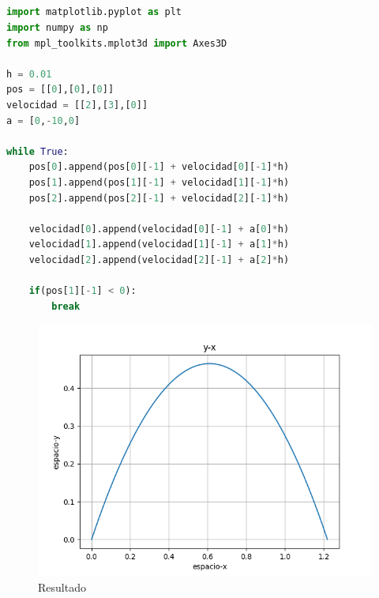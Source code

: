\documentclass{article}
\begin{document}
\subsection{}
\begin{lstlisting}[language=Python,caption=Desafío 1.1]
import matplotlib.pyplot as plt
import numpy as np
from mpl_toolkits.mplot3d import Axes3D

h = 0.01
pos = [[0],[0],[0]]
velocidad = [[2],[3],[0]]
a = [0,-10,0]

while True:
    pos[0].append(pos[0][-1] + velocidad[0][-1]*h)
    pos[1].append(pos[1][-1] + velocidad[1][-1]*h)
    pos[2].append(pos[2][-1] + velocidad[2][-1]*h)

    velocidad[0].append(velocidad[0][-1] + a[0]*h)
    velocidad[1].append(velocidad[1][-1] + a[1]*h)
    velocidad[2].append(velocidad[2][-1] + a[2]*h)

    if(pos[1][-1] < 0):
        break
\end{lstlisting}
\begin{figure}[H]
    \centering
    \includegraphics[width=1.21\textwidth]{2_1.png}
    \caption{Resultado}
\end{figure}
\end{document}
